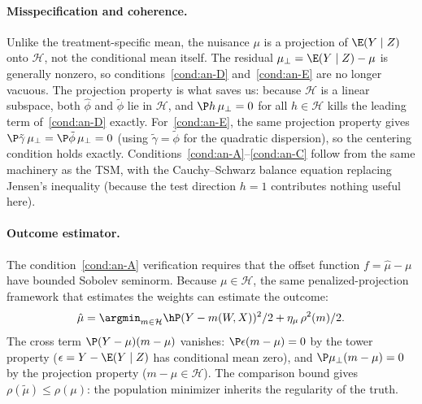 \documentclass{article}
\begin{document}
\paragraph{Misspecification and coherence.}
Unlike the treatment-specific mean,
the nuisance $\mu$ is a projection
of $\E(Y \mid Z)$ onto $\mathcal{H}$,
not the conditional mean itself.
The residual $\mu_\perp = \E(Y \mid Z) - \mu$
is generally nonzero,
so conditions~\ref{cond:an-D} and~\ref{cond:an-E}
are no longer vacuous.
The projection property is what saves us:
because $\mathcal{H}$ is a linear subspace,
both $\hat\phi$ and $\tilde\phi$ lie in $\mathcal{H}$,
and $\P h\,\mu_\perp = 0$ for all $h \in \mathcal{H}$
kills the leading term of~\ref{cond:an-D} exactly.
For~\ref{cond:an-E},
the same projection property gives
$\P\tilde\gamma\,\mu_\perp
  = \P\tilde\phi\,\mu_\perp = 0$
(using $\tilde\gamma = \tilde\phi$
for the quadratic dispersion),
so the centering condition
holds exactly.
Conditions~\ref{cond:an-A}--\ref{cond:an-C}
follow from the same machinery as the TSM,
with the Cauchy--Schwarz balance equation
replacing Jensen's inequality
(because the test direction $h = 1$
contributes nothing useful here).

\paragraph{Outcome estimator.}
The condition~\ref{cond:an-A} verification
requires that the offset function
$f = \hat\mu - \mu$
have bounded Sobolev seminorm.
Because $\mu \in \mathcal{H}$,
the same penalized-projection framework
that estimates the weights
can estimate the outcome:
\begin{equation}\label{eq:regression-outcome}
\hat\mu
  = \argmin_{m \in \mathcal{H}}
    \hP (Y - m(W,X))^2/2
    + \eta_\mu\, \rho^2(m)/2.
\end{equation}
The cross term
$\P(Y - \mu)(m - \mu)$
vanishes:
$\P\epsilon(m - \mu) = 0$
by the tower property
($\epsilon = Y - \E(Y \mid Z)$
has conditional mean zero),
and $\P\mu_\perp(m - \mu) = 0$
by the projection property
($m - \mu \in \mathcal{H}$).
The comparison bound
gives $\rho(\tilde\mu) \le \rho(\mu)$:
the population minimizer
inherits the regularity of the truth.
\end{document}
